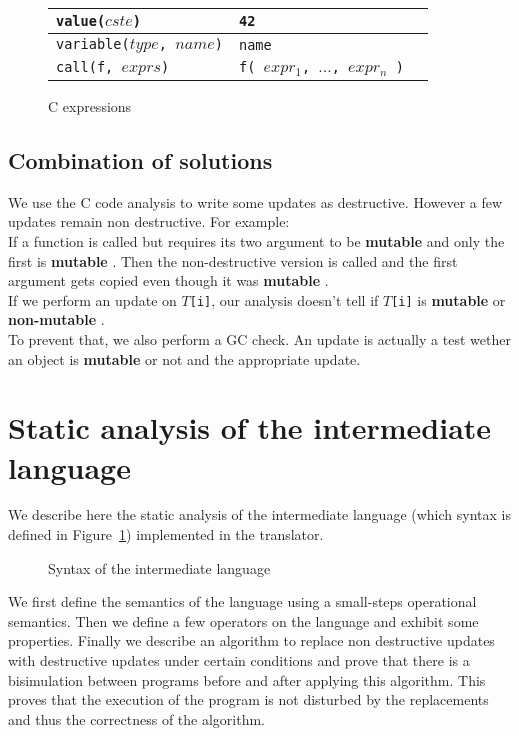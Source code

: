 \documentclass[12pt,a4paper]{article}
\newcommand{\cl}[1]{\texttt{#1}}
\newcommand{\mut}{  \textbf{ mutable } }
\newcommand{\nmut}{ \textbf{ non-mutable } }
\begin{document}
\begin{figure}
\begin{tabular}{|p{50mm}|p{50mm}|p{50mm}|}
\hline
\cl{value($cste$)} & \cl{42} & \\ \hline
\cl{variable($type$, $name$)} & \cl{name} & \\ \hline
\cl{call(f, $exprs$)} & \cl{f( $expr_1$, $...$, $expr_n$ )} & \\ \hline
\end{tabular}
\caption{C expressions}
\end{figure}




\subsection{Combination of solutions}

We use the C code analysis to write some updates as destructive. However a few updates remain non destructive. For example:\\

If a function is called but requires its two argument to be \mut  and only the first is \mut. Then the non-destructive version is called and the first argument gets copied even though it was \mut.\\

If we perform an update on \cl{$T$[i]}, our analysis doesn't tell if \cl{$T$[i]} is \mut or \nmut.\\

To prevent that, we also perform a GC check. An update is actually a test wether an object is \mut or not and the appropriate update.






\newpage
\section{Static analysis of the intermediate language}


We describe here the static analysis of the intermediate language (which syntax is defined in Figure~\ref{fig:aux-syntax}) implemented in the translator.

\begin{figure}[!ht]

\caption{Syntax of the intermediate language}
\label{fig:aux-syntax}
\end{figure}

We first define the semantics of the language using a small-steps operational semantics. Then we define a few operators on the language and exhibit some properties.
Finally we describe an algorithm to replace non destructive updates with destructive updates under certain conditions and prove that there is a bisimulation between programs before and after applying this algorithm. This proves that the execution of the program is not disturbed by the replacements and thus the correctness of the algorithm.
\end{document}
